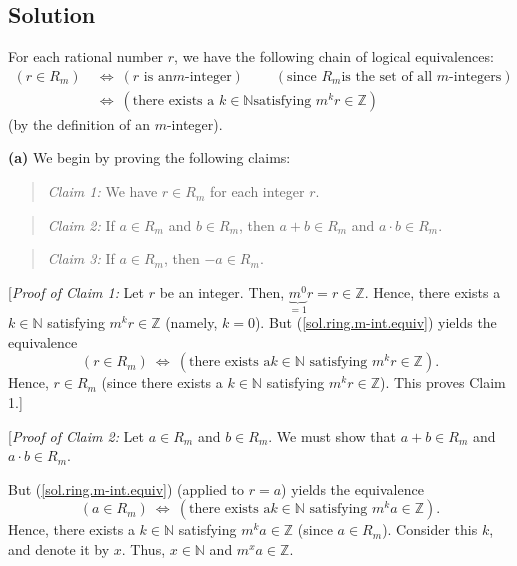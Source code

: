 \documentclass[paper=a4, fontsize=12pt]{scrartcl}%
\theoremstyle{plainsl}
\theoremstyle{definition}
\theoremstyle{remark}
\newenvironment{statement}{\begin{quote}}{\end{quote}}
\begin{document}
\subsection{Solution}

For each rational number $r$, we have the following chain of logical
equivalences:%
\begin{align}
\left(  r\in R_{m}\right)  \  &  \Longleftrightarrow\ \left(  r\text{ is an
}m\text{-integer}\right)  \ \ \ \ \ \ \ \ \ \ \left(  \text{since }R_{m}\text{
is the set of all }m\text{-integers}\right) \nonumber\\
&  \Longleftrightarrow\ \left(  \text{there exists a }k\in\mathbb{N}\text{
satisfying }m^{k}r\in\mathbb{Z}\right)  \label{sol.ring.m-int.equiv}%
\end{align}
(by the definition of an $m$-integer).

\bigskip

\textbf{(a)} We begin by proving the following claims:

\begin{statement}
\textit{Claim 1:} We have $r\in R_{m}$ for each integer $r$.
\end{statement}

\begin{statement}
\textit{Claim 2:} If $a\in R_{m}$ and $b\in R_{m}$, then $a+b\in R_{m}$ and
$a\cdot b\in R_{m}$.
\end{statement}

\begin{statement}
\textit{Claim 3:} If $a\in R_{m}$, then $-a\in R_{m}$.
\end{statement}

[\textit{Proof of Claim 1:} Let $r$ be an integer. Then, $\underbrace{m^{0}%
}_{=1}r=r\in\mathbb{Z}$. Hence, there exists a $k\in\mathbb{N}$ satisfying
$m^{k}r\in\mathbb{Z}$ (namely, $k=0$). But (\ref{sol.ring.m-int.equiv}) yields
the equivalence
\[
\left(  r\in R_{m}\right)  \ \Longleftrightarrow\ \left(  \text{there exists a
}k\in\mathbb{N}\text{ satisfying }m^{k}r\in\mathbb{Z}\right)  .
\]
Hence, $r\in R_{m}$ (since there exists a $k\in\mathbb{N}$ satisfying
$m^{k}r\in\mathbb{Z}$). This proves Claim 1.]

[\textit{Proof of Claim 2:} Let $a\in R_{m}$ and $b\in R_{m}$. We must show
that $a+b\in R_{m}$ and $a\cdot b\in R_{m}$.

But (\ref{sol.ring.m-int.equiv}) (applied to $r=a$) yields the equivalence
\[
\left(  a\in R_{m}\right)  \ \Longleftrightarrow\ \left(  \text{there exists a
}k\in\mathbb{N}\text{ satisfying }m^{k}a\in\mathbb{Z}\right)  .
\]
Hence, there exists a $k\in\mathbb{N}$ satisfying $m^{k}a\in\mathbb{Z}$ (since
$a\in R_{m}$). Consider this $k$, and denote it by $x$. Thus, $x\in\mathbb{N}$
and $m^{x}a\in\mathbb{Z}$.
\end{document}

